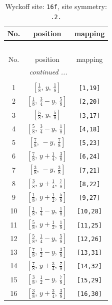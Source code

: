 \documentclass[fleqn,8pt]{jsarticle}
\begin{document}
\renewcommand{\arraystretch}{1.2}
\begin{longtable}{ccc}
\caption{Wyckoff site: {\tt 16f}, site symmetry: {\tt .2.}}
 \\
 \hline \hline
No. & position & mapping \\ \hline \endfirsthead

\multicolumn{2}{l}{\tablename\ \thetable{}} \\
 \hline \hline
No. & position & mapping \\ \hline \endhead

 \hline \hline
\multicolumn{2}{r}{\footnotesize\it continued ...} \\ \endfoot

 \hline \hline
\multicolumn{2}{r}{} \\ \endlastfoot

1 & $\left[ \frac{1}{8},\, y,\, \frac{1}{8} \right]$ & {\tt [1,19]} \\ \hline
2 & $\left[ \frac{1}{8},\, \frac{3}{4} - y,\, \frac{5}{8} \right]$ & {\tt [2,20]} \\ \hline
3 & $\left[ \frac{5}{8},\, y,\, \frac{5}{8} \right]$ & {\tt [3,17]} \\ \hline
4 & $\left[ \frac{5}{8},\, \frac{3}{4} - y,\, \frac{1}{8} \right]$ & {\tt [4,18]} \\ \hline
5 & $\left[ \frac{7}{8},\, - y,\, \frac{7}{8} \right]$ & {\tt [5,23]} \\ \hline
6 & $\left[ \frac{7}{8},\, y + \frac{1}{4},\, \frac{3}{8} \right]$ & {\tt [6,24]} \\ \hline
7 & $\left[ \frac{3}{8},\, - y,\, \frac{3}{8} \right]$ & {\tt [7,21]} \\ \hline
8 & $\left[ \frac{3}{8},\, y + \frac{1}{4},\, \frac{7}{8} \right]$ & {\tt [8,22]} \\ \hline
9 & $\left[ \frac{1}{8},\, y + \frac{1}{2},\, \frac{5}{8} \right]$ & {\tt [9,27]} \\ \hline
10 & $\left[ \frac{1}{8},\, \frac{1}{4} - y,\, \frac{1}{8} \right]$ & {\tt [10,28]} \\ \hline
11 & $\left[ \frac{5}{8},\, y + \frac{1}{2},\, \frac{1}{8} \right]$ & {\tt [11,25]} \\ \hline
12 & $\left[ \frac{5}{8},\, \frac{1}{4} - y,\, \frac{5}{8} \right]$ & {\tt [12,26]} \\ \hline
13 & $\left[ \frac{7}{8},\, \frac{1}{2} - y,\, \frac{3}{8} \right]$ & {\tt [13,31]} \\ \hline
14 & $\left[ \frac{7}{8},\, y + \frac{3}{4},\, \frac{7}{8} \right]$ & {\tt [14,32]} \\ \hline
15 & $\left[ \frac{3}{8},\, \frac{1}{2} - y,\, \frac{7}{8} \right]$ & {\tt [15,29]} \\ \hline
16 & $\left[ \frac{3}{8},\, y + \frac{3}{4},\, \frac{3}{8} \right]$ & {\tt [16,30]} \\
\end{longtable}
\end{document}
